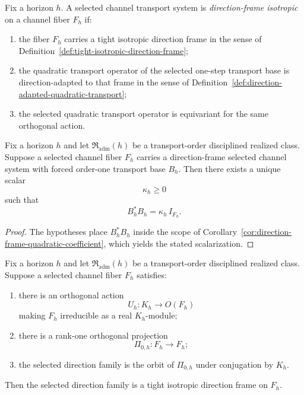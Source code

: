 \begin{definition}
\label{def:direction-frame-selected-channel-system}
Fix a horizon $h$. A selected channel transport system is
\emph{direction-frame isotropic} on a channel fiber $F_h$ if:
\begin{enumerate}[label=(\roman*), leftmargin=2em, itemsep=0.2em]
\item the fiber $F_h$ carries a tight isotropic direction frame in the sense of
      Definition~\ref{def:tight-isotropic-direction-frame};
\item the quadratic transport operator of the selected one-step transport base
      is direction-adapted to that frame in the sense of
      Definition~\ref{def:direction-adapted-quadratic-transport};
\item the selected quadratic transport operator is equivariant for the same
      orthogonal action.
\end{enumerate}
\end{definition}

\begin{corollary}
\label{cor:realized-direction-frame-quadratic-transport}
Fix a horizon $h$ and let $\mathfrak R_{\mathrm{adm}}(h)$ be a transport-order
disciplined realized class. Suppose a selected channel fiber $F_h$ carries a
direction-frame selected channel system with forced order-one transport base
$B_h$. Then there exists a unique scalar
\[
\kappa_h\ge 0
\]
such that
\[
B_h^*B_h=\kappa_h\,I_{F_h}.
\]
\end{corollary}

\begin{proof}
The hypotheses place $B_h^*B_h$ inside the scope of
Corollary~\ref{cor:direction-frame-quadratic-coefficient}, which yields the
stated scalarization.
\end{proof}

\begin{corollary}
\label{cor:realized-orbit-direction-frame}
Fix a horizon $h$ and let $\mathfrak R_{\mathrm{adm}}(h)$ be a transport-order
disciplined realized class. Suppose a selected channel fiber $F_h$ satisfies:
\begin{enumerate}[label=(\roman*), leftmargin=2em, itemsep=0.2em]
\item there is an orthogonal action
      \[
      U_h:K_h\to O(F_h)
      \]
      making $F_h$ irreducible as a real $K_h$-module;
\item there is a rank-one orthogonal projection
      \[
      \Pi_{0,h}:F_h\to F_h;
      \]
\item the selected direction family is the orbit of $\Pi_{0,h}$ under
      conjugation by $K_h$.
\end{enumerate}
Then the selected direction family is a tight isotropic direction frame on
$F_h$.
\end{corollary}

